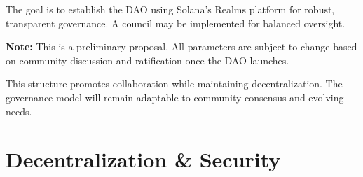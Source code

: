 \documentclass{article}
\begin{document}
\begin{tcolorbox}[colback=headerColor!10!white, colframe=headerColor, boxrule=2pt, width=\textwidth, arc=6mm]
The goal is to establish the DAO using Solana's Realms platform for robust, transparent governance. A council may be implemented for balanced oversight.

\medskip
\noindent\textbf{Note:} This is a preliminary proposal. All parameters are subject to change based on community discussion and ratification once the DAO launches.

\medskip
This structure promotes collaboration while maintaining decentralization. The governance model will remain adaptable to community consensus and evolving needs.
\end{tcolorbox}


\section[
  \texorpdfstring{\color{primaryColor}Decentralization \& Security}{Decentralization \& Security}
]{\color{primaryColor}\textbf{Decentralization \& Security}}
\end{document}
